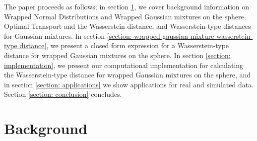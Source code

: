 \documentclass[]{article}
\begin{document}
The paper proceeds as follows; in section \ref{section: theory}, we cover background information on Wrapped Normal Distributions and Wrapped Gaussian mixtures on the sphere, Optimal Transport and the Wasserstein distance, and Wasserstein-type distances for Gaussian mixtures. In section \ref{section: wrapped gaussian mixture wasserstein-type distance}, we present a closed form expression for a Wasserstein-type distance for wrapped Gaussian mixtures on the sphere. In section \ref{section: implementation}, we present our computational implementation for calculating the Wasserstein-type distance for wrapped Gaussian mixtures on the sphere, and in section \ref{section: applications} we show applications for real and simulated data. Section \ref{section: conclusion} concludes.  

\section{Background}\label{section: theory}

%
%
\end{document}
